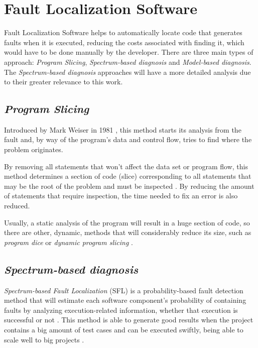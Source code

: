 \section{Fault Localization Software}

Fault Localization Software helps to automatically locate code that generates faults when it is executed, reducing the costs associated with finding it, which would have to be done manually by the developer.  There are three main types of approach: \emph{Program Slicing}, \emph{Spectrum-based diagnosis} and \emph{Model-based diagnosis}. The \emph{Spectrum-based diagnosis} approaches will have a more detailed analysis due to their greater relevance to this work.

%
%

\subsection{\emph{Program Slicing}}

Introduced by Mark Weiser in 1981 \cite{Weiser1981, Weiser1982}, this method starts its analysis from the fault and, by way of the program's data and control flow, tries to find where the problem originates.

By removing all statements that won't affect the data set or program flow, this method determines a section of code (slice) corresponding to all statements that may be the root of the problem and must be inspected \cite{Perez2004}. By reducing the amount of statements that require inspection, the time needed to fix an error is also reduced.

Usually, a static analysis of the program will result in a huge section of code, so there are other, dynamic, methods that will considerably reduce its size, such as \emph{program dice} or \emph{dynamic program slicing} \cite{Perez2004}.

%
%

\subsection{\emph{Spectrum-based diagnosis}}

\emph{Spectrum-based Fault Localization} (SFL) is a probability-based fault detection method that will estimate each software component's probability of containing faults by analyzing execution-related information, whether that execution is successful or not \cite{Abreu2007}. This method is able to generate good results when the project contains a big amount of test cases and can be executed swiftly, being able to scale well to big projects \cite{Mayer2008}.

